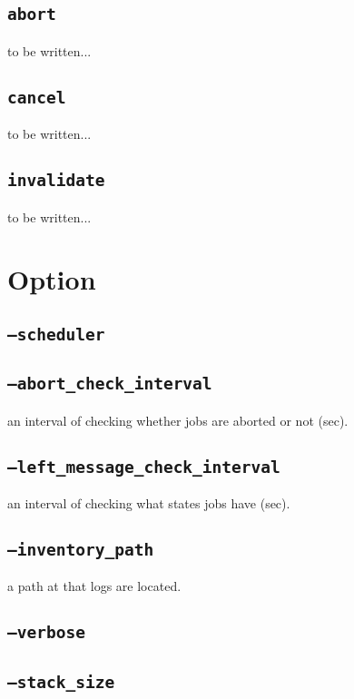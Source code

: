 \documentclass[a4paper,10pt]{report}
\begin{document}
\section{\texttt{abort}}
to be written...
\section{\texttt{cancel}}
to be written...
\section{\texttt{invalidate}}
to be written...

\chapter{Option}\label{chapoption}

\section{\texttt{--scheduler}}
\section{\texttt{--abort\_check\_interval}}

an interval of checking whether jobs are aborted or not (sec).

\section{\texttt{--left\_message\_check\_interval}}

an interval of checking what states jobs have (sec).

\section{\texttt{--inventory\_path}}

a path at that logs are located.

\section{\texttt{--verbose}}
\section{\texttt{--stack\_size}}
\end{document}
